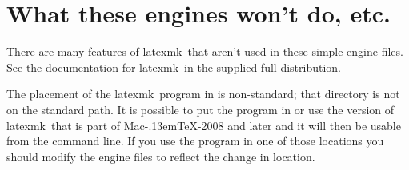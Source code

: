 \documentclass[11pt]{article}
\newcommand{\cmd}[1]{\textsf{#1}}
\newcommand{\MacTeX}{Mac\kern-.13em\TeX}
\newcommand{\TS}{\textsf{\TeX Shop}}
\newcommand{\latexmk}{\textsf{latexmk}}
\begin{document}
\section{What these engines won't do, etc.}

There are many features of \latexmk\ that aren't used in these simple \cmd{engine} files. See the documentation for \latexmk\ in the supplied full distribution.

The placement of the \latexmk\ program in  is non-standard; that directory is not on the standard path. It is possible to put the program in  or use the version of \latexmk\ that is part of \MacTeX-2008 and later and it will then be usable from the command line. If you use the program in one of those locations you should modify the \cmd{engine} files to reflect the change in location.


\end{document}
